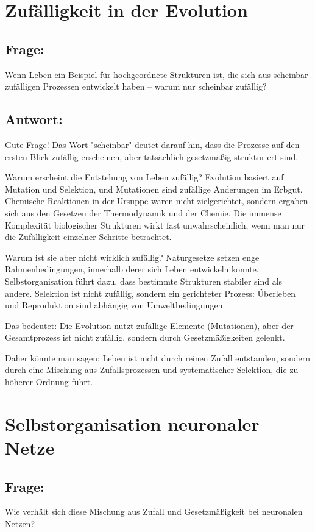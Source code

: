 \documentclass{article}
\begin{document}
	\section{Zufälligkeit in der Evolution}
	
	\subsection*{Frage:}
	Wenn Leben ein Beispiel für hochgeordnete Strukturen ist, die sich aus scheinbar zufälligen Prozessen entwickelt haben – warum nur scheinbar zufällig?
	
	\subsection*{Antwort:}
	Gute Frage! Das Wort "scheinbar" deutet darauf hin, dass die Prozesse auf den ersten Blick zufällig erscheinen, aber tatsächlich gesetzmäßig strukturiert sind.
	
	Warum erscheint die Entstehung von Leben zufällig?
	Evolution basiert auf Mutation und Selektion, und Mutationen sind zufällige Änderungen im Erbgut.
	Chemische Reaktionen in der Ursuppe waren nicht zielgerichtet, sondern ergaben sich aus den Gesetzen der Thermodynamik und der Chemie.
	Die immense Komplexität biologischer Strukturen wirkt fast unwahrscheinlich, wenn man nur die Zufälligkeit einzelner Schritte betrachtet.
	
	Warum ist sie aber nicht wirklich zufällig?
	Naturgesetze setzen enge Rahmenbedingungen, innerhalb derer sich Leben entwickeln konnte.
	Selbstorganisation führt dazu, dass bestimmte Strukturen stabiler sind als andere.
	Selektion ist nicht zufällig, sondern ein gerichteter Prozess: Überleben und Reproduktion sind abhängig von Umweltbedingungen.
	
	Das bedeutet: Die Evolution nutzt zufällige Elemente (Mutationen), aber der Gesamtprozess ist nicht zufällig, sondern durch Gesetzmäßigkeiten gelenkt.
	
	Daher könnte man sagen: Leben ist nicht durch reinen Zufall entstanden, sondern durch eine Mischung aus Zufallsprozessen und systematischer Selektion, die zu höherer Ordnung führt.
	
	\section{Selbstorganisation neuronaler Netze}
	
	\subsection*{Frage:}
	Wie verhält sich diese Mischung aus Zufall und Gesetzmäßigkeit bei neuronalen Netzen?
	
\end{document}
